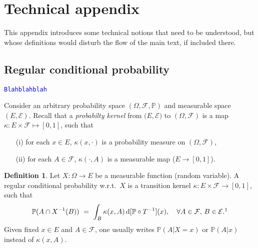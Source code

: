 \documentclass[12pt]{article}
\renewcommand{\d}{\mathrm{d}}
\newcommand{\F}{\mathcal{F}}
\renewcommand{\P}{\mathbb{P}}
\newcommand{\set}[1]{\left\{#1\right\}}
\newcommand{\ra}{\rightarrow}
\newcommand{\pika}{\boldsymbol{\cdot}}
\newcommand{\1}{\mathbbm{1}}
\newcommand{\5}{\vspace{0.5cm}}
\theoremstyle{definition}
\newtheorem{df}[thm]{Definition}
\begin{document}
\appendix

\section{Technical appendix}

This appendix introduces some technical notions that need to be understood, but whose definitions would disturb the flow of the main text, if included there.


\subsection{Regular conditional probability }

\textcolor{blue}{\texttt{Blahblahblah}} %

Consider an arbitrary probability space $(\Omega,\F,\P)$ and measurable space $(E,\mathcal{E})$. Recall that a \textit{probabilty kernel} from $(E,\mathcal{E)}$ to $(\Omega,\F)$ is a map $\kappa:E\times\F\mapsto[0,1]$, such that
\begin{itemize}
	\item[(i)] for each $x\in E$, $\kappa(x,\pika)$ is a probability measure on $(\Omega,\F)$,
	\item[(ii)] for each $A\in\F$, $\kappa(\pika,A)$ is a measurable map ($E\ra[0,1]$).
\end{itemize}

\begin{df}
Let $X:\Omega\ra E$ be a measurable function (random variable). A regular conditional probability w.r.t.~$X$ is a transition kernel $\kappa:E\times\F\ra[0,1]$, such that
$$\P(A\cap X^{-1}(B)) ~=~ \int_B \kappa(x,A)\,\d[\P\circ T^{-1}](x), \quad \forall A\in\F,\,B\in\mathcal{E}.\footnote{Instead of $\P(A\cap X^{-1}(B))$, one could also write $\P(A\cap\set{X\in B)}$ or $\P(A~\text{and}~X\in B)$.}$$ 
Given fixed $x\in E$ and $A\in\F$, one usually writes $\P(A|X=x)$ or $\P(A|x)$ instead of $\kappa(x,A)$.
\end{df}
\end{document}
